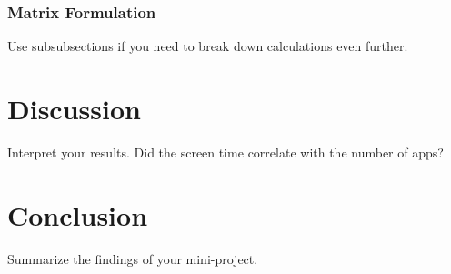 \documentclass[12pt, a4paper]{article}
\begin{document}
\subsubsection{Matrix Formulation}
Use subsubsections if you need to break down calculations even further.

\section{Discussion}
Interpret your results. Did the screen time correlate with the number of apps?

\section{Conclusion}
Summarize the findings of your mini-project.

\newpage 


\newpage

\appendix 

\end{document}

